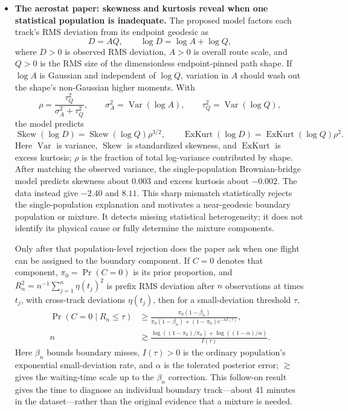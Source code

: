 \documentclass[10pt]{article}
\begin{document}
\begin{itemize}
\item \textbf{The aerostat paper: skewness and kurtosis reveal when one statistical population is inadequate.}
The proposed model factors each track's RMS deviation from its endpoint geodesic as
\[
  D=AQ,
  \qquad \log D=\log A+\log Q,
\]
where $D>0$ is observed RMS deviation, $A>0$ is overall route scale, and $Q>0$ is the RMS size of the dimensionless endpoint-pinned path shape. If $\log A$ is Gaussian and independent of $\log Q$, variation in $A$ should wash out the shape's non-Gaussian higher moments. With
\[
  \rho=\frac{\tau_Q^2}{\sigma_A^2+\tau_Q^2},
  \qquad \sigma_A^2=\operatorname{Var}(\log A),
  \qquad \tau_Q^2=\operatorname{Var}(\log Q),
\]
the model predicts
\[
  \operatorname{Skew}(\log D)=\operatorname{Skew}(\log Q)\rho^{3/2},
  \qquad
  \operatorname{ExKurt}(\log D)=\operatorname{ExKurt}(\log Q)\rho^2.
\]
Here $\operatorname{Var}$ is variance, $\operatorname{Skew}$ is standardized skewness, and $\operatorname{ExKurt}$ is excess kurtosis; $\rho$ is the fraction of total log-variance contributed by shape. After matching the observed variance, the single-population Brownian-bridge model predicts skewness about $0.003$ and excess kurtosis about $-0.002$. The data instead give $-2.40$ and $8.11$. This sharp mismatch statistically rejects the single-population explanation and motivates a near-geodesic boundary population or mixture. It detects missing statistical heterogeneity; it does not identify its physical cause or fully determine the mixture components.

Only after that population-level rejection does the paper ask when one flight can be assigned to the boundary component. If $C=0$ denotes that component, $\pi_0=\Pr(C=0)$ is its prior proportion, and $R_n^2=n^{-1}\sum_{j=1}^n\eta(t_j)^2$ is prefix RMS deviation after $n$ observations at times $t_j$, with cross-track deviations $\eta(t_j)$, then for a small-deviation threshold $\tau$,
\[
 \begin{aligned}
 \Pr(C=0\mid R_n\leq\tau)
 &\geq \frac{\pi_0(1-\beta_n)}
 {\pi_0(1-\beta_n)+(1-\pi_0)e^{-nI(\tau)}},\\[-1pt]
 n&\gtrsim
 \frac{\log((1-\pi_0)/\pi_0)+\log((1-\alpha)/\alpha)}{I(\tau)}.
 \end{aligned}
\]
Here $\beta_n$ bounds boundary misses, $I(\tau)>0$ is the ordinary population's exponential small-deviation rate, and $\alpha$ is the tolerated posterior error; $\gtrsim$ gives the waiting-time scale up to the $\beta_n$ correction. This follow-on result gives the time to diagnose an individual boundary track---about 41 minutes in the dataset---rather than the original evidence that a mixture is needed.
\end{itemize}
\end{document}
